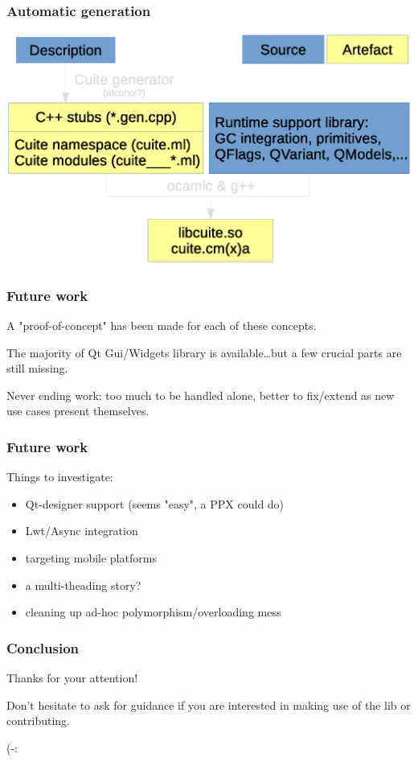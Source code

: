 \documentclass[serif,mathserif]{beamer}
\begin{document}
\begin{frame}
  \frametitle{Automatic generation}

  \includegraphics[width=\textwidth]{compilation_workflow}

\end{frame}

\begin{frame}
  \frametitle{Future work}

  A "proof-of-concept" has been made for each of these concepts.
  \pause

  The majority of Qt Gui/Widgets library is available\ldots but a few crucial
  parts are still missing.
  \pause

  Never ending work: too much to be handled alone, better to fix/extend as new
  use cases present themselves. 
\end{frame}

\begin{frame}
  \frametitle{Future work}

  Things to investigate:
  \begin{itemize}
    \item Qt-designer support (seems "easy", a PPX could do)
    \item Lwt/Async integration
    \item targeting mobile platforms 
    \item a multi-theading story?
    \item cleaning up ad-hoc polymorphism/overloading mess
  \end{itemize}
\end{frame}

\begin{frame}
  \frametitle{Conclusion}

  Thanks for your attention!
  \bigskip
  
  Don't hesitate to ask for guidance if you are interested in making use of
  the lib or contributing.
  \bigskip

  {
    \center 

    \huge (-:
  
  }

\end{frame}
\end{document}
